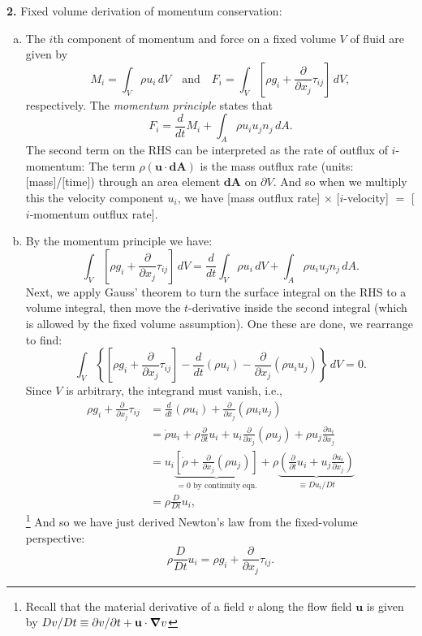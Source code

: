 \documentclass[11pt]{article}
\newcommand{\f}[2]{\frac{#1}{#2}}
\newcommand{\p}{\partial}%
\begin{document}
\noindent \textbf{2.} Fixed volume derivation of momentum conservation:
\begin{enumerate}[(a)]
	\item The $i$th component of momentum and force on a fixed volume $V$ of fluid are given by
	\begin{equation*}
	M_i = \int_V \rho u_i \,dV \quad \text{and} \quad F_i = \int_V \left[\rho g_i + \f{\p}{\p x_j}\tau_{ij} \right]\,dV,
	\end{equation*}
	respectively. The \textit{momentum principle} states that
	\begin{equation*}
	F_i = \f{d}{dt}M_i + \int_A \rho u_i u_j n_j \,dA.
	\end{equation*}
	The second term on the RHS can be interpreted as the rate of outflux of $i$-momentum: The term $\rho (\mathbf{u\cdot dA})$ is the mass outflux rate (units: [mass]/[time]) through an area element $\mathbf{dA}$ on $\p V$. And so when we multiply this the velocity component $u_i$, we have [mass outflux rate] $\times$ [$i$-velocity] $=$ [$i$-momentum outflux rate].
	
	
	
	\item By the momentum principle we have:
	\begin{equation*}
	\int_V \left[\rho g_i + \f{\p}{\p x_j}\tau_{ij} \right]\,dV = \f{d}{dt}\int_V \rho u_i \,dV + \int_A \rho u_i u_j n_j \,dA.
	\end{equation*}
	Next, we apply Gauss' theorem to turn the surface integral on the RHS to a volume integral, then move the $t$-derivative inside the second integral (which is allowed by the fixed volume assumption). One these are done, we rearrange to find:
	\begin{equation*}
	\int_V \left\{ \left[\rho g_i + \f{\p}{\p x_j}\tau_{ij} \right] - \f{d}{dt}(\rho u_i) - \f{\p}{\p x_j}(\rho u_i u_j)   \right\}\,dV = 0.
	\end{equation*}
	Since $V$ is arbitrary, the integrand must vanish, i.e., 
	\begin{align*}
	\rho g_i + \f{\p}{\p x_j}\tau_{ij} 
	&=  \f{d}{dt}(\rho u_i) + \f{\p}{\p x_j}(\rho u_i u_j) \\
	&=  \dot{\rho}u_i + \rho \f{\p}{\p t}u_i + u_i\f{\p}{\p x_j}(\rho u_j) + \rho u_j\f{\p u_i}{\p x_j}\\
	&= u_i \underbrace{\left[ \dot{\rho} + \f{\p}{\p x_j}(\rho u_j) \right]}_{= 0 \text{ by continuity eqn.}}  + \rho\underbrace{\left( \f{\p}{\p t}u_i  + u_j \f{\p u_i}{\p x_j} \right)}_{\equiv D u_i / Dt}\\
	&= \rho \f{D}{Dt}u_i, 
	\end{align*}
	\footnote{Recall that the material derivative of a field $v$ along the flow field $\mathbf{u}$ is given by $Dv/Dt \equiv \p v/\p t + \textbf{u}\cdot \grad v $}
	And so we have just derived Newton's law from the fixed-volume perspective:
	\begin{equation*}
	\rho \f{D}{Dt}u_i = \rho g_i + \f{\p}{\p x_j}\tau_{ij}.
	\end{equation*}
\end{enumerate}
\end{document}
